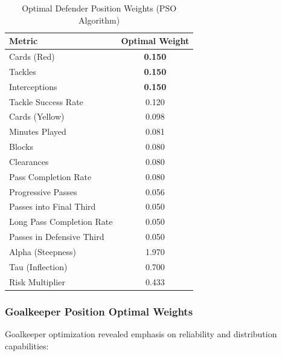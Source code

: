 \begin{table}[H]
\centering
\caption{Optimal Defender Position Weights (PSO Algorithm)}
\label{tab:defender_weights}
\begin{tabular}{lc}
\toprule
\textbf{Metric} & \textbf{Optimal Weight} \\
\midrule
Cards (Red) & \textbf{0.150} \\
Tackles & \textbf{0.150} \\
Interceptions & \textbf{0.150} \\
Tackle Success Rate & 0.120 \\
Cards (Yellow) & 0.098 \\
Minutes Played & 0.081 \\
Blocks & 0.080 \\
Clearances & 0.080 \\
Pass Completion Rate & 0.080 \\
Progressive Passes & 0.056 \\
Passes into Final Third & 0.050 \\
Long Pass Completion Rate & 0.050 \\
Passes in Defensive Third & 0.050 \\
\midrule
Alpha (Steepness) & 1.970 \\
Tau (Inflection) & 0.700 \\
Risk Multiplier & 0.433 \\
\bottomrule
\end{tabular}
\end{table}

\subsubsection{Goalkeeper Position Optimal Weights}

Goalkeeper optimization revealed emphasis on reliability and distribution capabilities:

